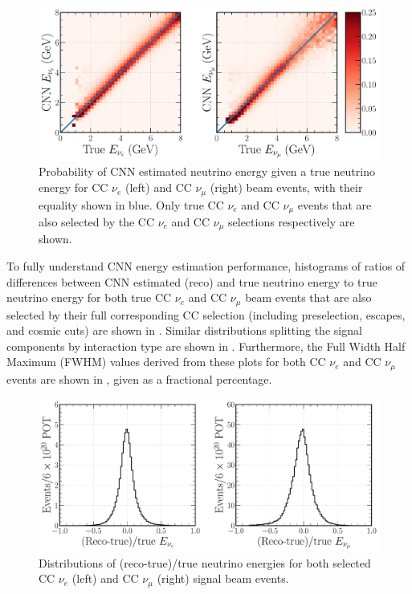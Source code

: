 \begin{figure} %
    \includegraphics[width=\textwidth]{diagrams/7-results/final_energy_2d.pdf}
    \caption[Probability of CNN estimated neutrino energy given a true neutrino energy]
    {Probability of CNN estimated neutrino energy given a true neutrino energy for CC $\nu_{e}$
        (left) and CC $\nu_{\mu}$ (right) beam events, with their equality shown in blue. Only
        true CC $\nu_{e}$ and CC $\nu_{\mu}$ events that are also selected by the CC $\nu_{e}$ and
        CC $\nu_{\mu}$ selections respectively are shown.}
    \label{fig:final_energy_2d}
\end{figure}

To fully understand CNN energy estimation performance, histograms of ratios of differences between
CNN estimated (reco) and true neutrino energy to true neutrino energy for both true CC $\nu_{e}$
and CC $\nu_{\mu}$ beam events that are also selected by their full corresponding CC selection
(including preselection, escapes, and cosmic cuts) are shown in .
Similar distributions splitting the signal components by interaction type are shown in
. Furthermore, the Full Width Half Maximum (FWHM) values
derived from these plots for both CC $\nu_{e}$ and CC $\nu_{\mu}$ events are shown in
, given as a fractional percentage.

\begin{figure} %
    \includegraphics[width=\textwidth]{diagrams/7-results/final_energy_frac.pdf}
    \caption[Distributions of (reco-true)/true neutrino energies]
    {Distributions of (reco-true)/true neutrino energies for both selected CC $\nu_{e}$ (left) and
        CC $\nu_{\mu}$ (right) signal beam events.}
    \label{fig:final_energy_frac}
\end{figure}

